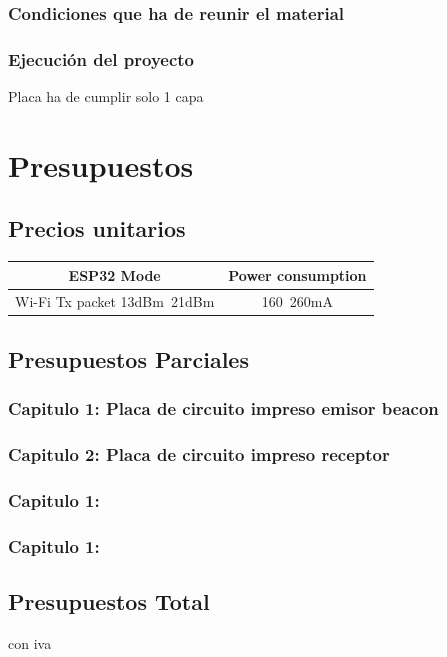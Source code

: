 \documentclass[a4paper ,12pt, onecolumn]{article}
\begin{document}
        \subsubsection{Condiciones que ha de reunir el material}
        \subsubsection{Ejecución del proyecto}
        Placa ha de cumplir solo 1 capa
\section{Presupuestos}
    \subsection{Precios unitarios}
        \begin{center}
            \begin{tabular}{||c | c ||} 
            \hline
            ESP32 Mode & Power consumption  \\ [0.5ex] 
            \hline\hline
            Wi-Fi Tx packet 13dBm~21dBm & 160~260mA  \\ 
            \hline
            \end{tabular}
        \end{center}
    \subsection{Presupuestos Parciales}
        \subsubsection{Capitulo 1: Placa de circuito impreso emisor beacon}
        \subsubsection{Capitulo 2: Placa de circuito impreso receptor}
        \subsubsection{Capitulo 1: }
        \subsubsection{Capitulo 1: }
    \subsection{Presupuestos Total}
        con iva
\end{document}

